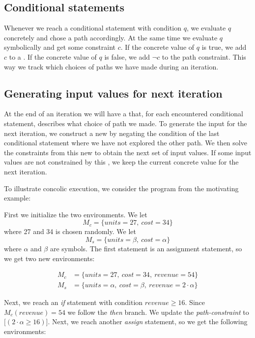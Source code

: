 	\subsection{Conditional statements}
	
	Whenever we reach a conditional statement with condition $q$, we evaluate $q$ concretely and chose a path accordingly. At the same time we evaluate $q$ symbolically and get some constraint $c$. If the concrete value of $q$ is true, we add $c$ to a \pc. If the concrete value of $q$ is false, we add $\neg c$ to the path constraint. This way we track which choices of paths we have made during an iteration. 
	
	\subsection{Generating input values for next iteration}
	
	At the end of an iteration we will have a \pc that, for each encountered conditional statement, describes what choice of path we made. To generate the input for the next iteration, we construct a new \pc by negating the condition of the last conditional statement where we have not explored the other path. We then solve the constraints from this new \pc to obtain the next set of input values. If some input values are not constrained by this \pc, we keep the current concrete value for the next iteration. 

\bigskip
To illustrate concolic execution, we consider the program from the motivating example:
\motexample

\noindent First we initialize the two environments. We let 
\begin{equation*}
	M_c = \{units = 27, \ cost = 34\}
\end{equation*}
 where 27 and 34 is chosen randomly. We let
\begin{equation*}
 	M_s = \{units =\beta, \ cost = \alpha\}
\end{equation*}
where $\alpha$ and $\beta$ are symbols. The first statement is an assignment statement, so we get two new environments:

\begin{align*}
	M_c & = \{units = 27, \ cost = 34, \ revenue = 54 \}\\
	M_s & = \{units = \alpha, \ cost = \beta, \ revenue = 2\cdot \alpha \}
\end{align*}

Next, we reach an \textsl{if} statement with condition $revenue \geq 16$. Since $M_c(revenue) = 54$ we follow the \textsl{then} branch. We update the \emph{path-constraint} to $\lbrack (2\cdot \alpha \geq 16) \rbrack$. Next, we reach another \textsl{assign} statement, so we get the following environments:

